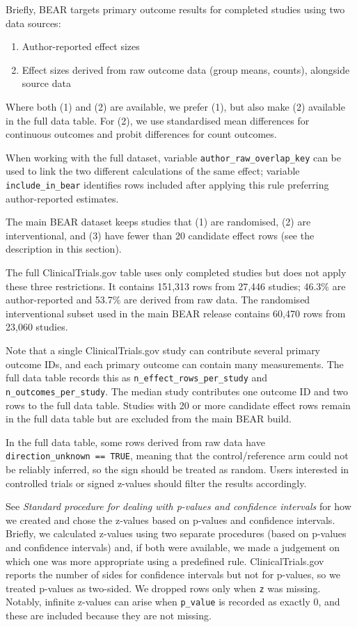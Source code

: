 \documentclass[
  11pt,
]{article}
\providecommand{\tightlist}{%
  \setlength{\itemsep}{0pt}\setlength{\parskip}{0pt}}
\begin{document}
Briefly, BEAR targets primary outcome results for completed studies
using two data sources:

\begin{enumerate}
\def\labelenumi{(\arabic{enumi})}
\tightlist
\item
  Author-reported effect sizes
\item
  Effect sizes derived from raw outcome data (group means, counts),
  alongside source data
\end{enumerate}

Where both (1) and (2) are available, we prefer (1), but also make (2)
available in the full data table. For (2), we use standardised mean
differences for continuous outcomes and probit differences for count
outcomes.

When working with the full dataset, variable
\texttt{author\_raw\_overlap\_key} can be used to link the two different
calculations of the same effect; variable \texttt{include\_in\_bear}
identifies rows included after applying this rule preferring
author-reported estimates.

The main BEAR dataset keeps studies that (1) are randomised, (2) are
interventional, and (3) have fewer than 20 candidate effect rows (see
the description in this section).

The full ClinicalTrials.gov table uses only completed studies but does
not apply these three restrictions. It contains 151,313 rows from 27,446
studies; 46.3\% are author-reported and 53.7\% are derived from raw
data. The randomised interventional subset used in the main BEAR release
contains 60,470 rows from 23,060 studies.

Note that a single ClinicalTrials.gov study can contribute several
primary outcome IDs, and each primary outcome can contain many
measurements. The full data table records this as
\texttt{n\_effect\_rows\_per\_study} and
\texttt{n\_outcomes\_per\_study}. The median study contributes one
outcome ID and two rows to the full data table. Studies with 20 or more
candidate effect rows remain in the full data table but are excluded
from the main BEAR build.

In the full data table, some rows derived from raw data have
\texttt{direction\_unknown\ ==\ TRUE}, meaning that the
control/reference arm could not be reliably inferred, so the sign should
be treated as random. Users interested in controlled trials or signed
z-values should filter the results accordingly.

See \emph{Standard procedure for dealing with p-values and confidence
intervals} for how we created and chose the z-values based on p-values
and confidence intervals. Briefly, we calculated z-values using two
separate procedures (based on p-values and confidence intervals) and, if
both were available, we made a judgement on which one was more
appropriate using a predefined rule. ClinicalTrials.gov reports the
number of sides for confidence intervals but not for p-values, so we
treated p-values as two-sided. We dropped rows only when \texttt{z} was
missing. Notably, infinite z-values can arise when \texttt{p\_value} is
recorded as exactly 0, and these are included because they are not
missing.
\end{document}
